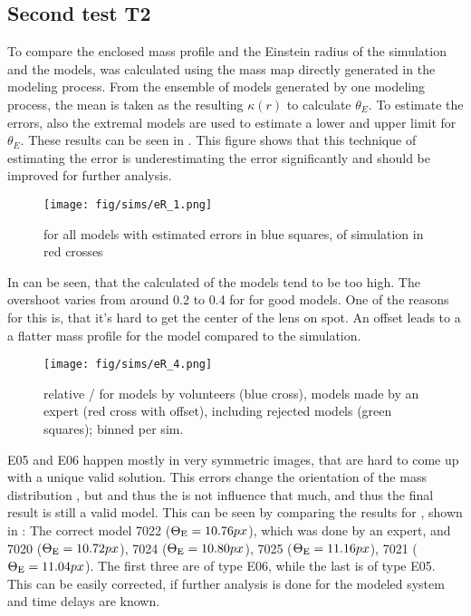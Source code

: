 \subsection{Second test T2} \label{sec:tests.t2}

To compare the enclosed mass profile and the Einstein radius of the simulation and the models, \kenc was calculated using the mass map \kap[x,y] directly generated in the modeling process.
From the ensemble of models generated by one modeling process, the mean is taken as the resulting $\kappa(r)$ to calculate $\theta_E$.
To estimate the errors, also the extremal models are used to estimate a lower and upper limit for $\theta_E$.
These results can be seen in .
This figure shows that this technique of estimating the error is underestimating the error significantly and should be improved for further analysis.

\begin{figure}[htbp]
  \centering
    \texttt{[image: fig/sims/eR\_1.png]}
  \caption{\ERf for all models with estimated errors in blue squares, \ERg of simulation in red crosses}
  \label{fig:ER_all_models}
\end{figure}

In  can be seen, that the calculated \ERf of the models tend to be too high.
The overshoot varies from around 0.2 to 0.4 for for good models.
One of the reasons for this is, that it's hard to get the center of the lens on spot.
An offset leads to a a flatter mass profile for the model compared to the simulation.



\begin{figure}[htbp]
  \centering
    \texttt{[image: fig/sims/eR\_4.png]}
  \caption{relative \ERf / \ERg[, sim] for models by volunteers (blue cross), models made by an expert (red cross with offset), including rejected models (green squares); binned per sim.}
  \label{fig:ER_per_sim}
\end{figure}


E05 and E06 happen mostly in very symmetric images, that are hard to come up with a unique valid solution.
This errors change the orientation of the mass distribution \kap[x,y],
but \kenc and thus the \ERf is not influence that much, and thus the final result is still a valid model.
This can be seen by comparing the results for , shown in : 
The correct model 7022 ($\Theta_\text{E}=10.76px$), which was done by an expert, and
7020 ($\Theta_\text{E}=10.72px$),
7024 ($\Theta_\text{E}=10.80px$),
7025 ($\Theta_\text{E}=11.16px$),
7021 ($\Theta_\text{E}=11.04px$).
The first three are of type E06, while the last is of type E05.
This can be easily corrected, if further analysis is done for the modeled system and time delays are known.

